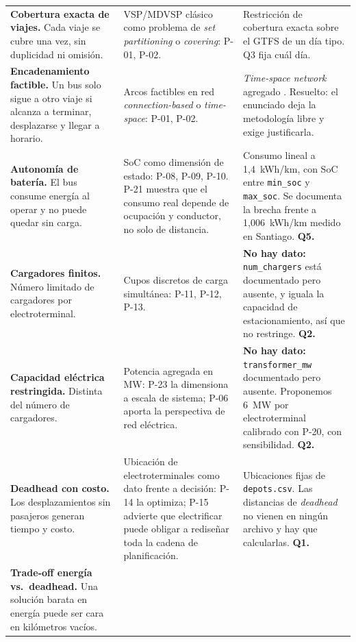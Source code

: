 \documentclass[11pt,a4paper,parskip=half]{scrartcl}
\begin{document}
\begin{landscape}
\begin{longtable}{@{}L{4.4cm}L{8.4cm}L{8.4cm}@{}}
\textbf{Cobertura exacta de viajes.} Cada viaje se cubre una vez, sin duplicidad ni omisión. &
VSP/MDVSP clásico como problema de \textit{set partitioning} o \textit{covering}: P-01, P-02. &
Restricción de cobertura exacta sobre el GTFS de un día tipo. \textcolor{slate}{Q3 fija cuál día.} \\
\addlinespace
{}
\textbf{Encadenamiento factible.} Un bus solo sigue a otro viaje si alcanza a terminar, desplazarse y llegar a horario. &
Arcos factibles en red \textit{connection-based} o \textit{time-space}: P-01, P-02. &
\textit{Time-space network} agregado \citep{kliewer_timespacemdvsp_2006}. \textcolor{slate}{Resuelto: el enunciado deja la metodología libre y exige justificarla.} \\
\addlinespace
\textbf{Autonomía de batería.} El bus consume energía al operar y no puede quedar sin carga. &
SoC como dimensión de estado: P-08, P-09, P-10. P-21 muestra que el consumo real depende de ocupación y conductor, no solo de distancia. &
Consumo lineal a 1{,}4~kWh/km, con SoC entre \texttt{min\_soc} y \texttt{max\_soc}. Se documenta la brecha frente a 1{,}006~kWh/km medido en Santiago. \textbf{Q5.} \\
\addlinespace
{}
\textbf{Cargadores finitos.} Número limitado de cargadores por electroterminal. &
Cupos discretos de carga simultánea: P-11, P-12, P-13. &
\textbf{No hay dato:} \texttt{num\_chargers} está documentado pero ausente, y  iguala la capacidad de estacionamiento, así que no restringe. \textbf{Q2.} \\
\addlinespace
\textbf{Capacidad eléctrica restringida.} Distinta del número de cargadores. &
Potencia agregada en MW: P-23 la dimensiona a escala de sistema; P-06 aporta la perspectiva de red eléctrica. &
\textbf{No hay dato:} \texttt{transformer\_mw} documentado pero ausente. Proponemos 6~MW por electroterminal calibrado con P-20, con sensibilidad. \textbf{Q2.} \\
\addlinespace
{}
\textbf{Deadhead con costo.} Los desplazamientos sin pasajeros generan tiempo y costo. &
Ubicación de electroterminales como dato frente a decisión: P-14 la optimiza; P-15 advierte que electrificar puede obligar a rediseñar toda la cadena de planificación. &
Ubicaciones fijas de \texttt{depots.csv}. Las distancias de \textit{deadhead} no vienen en ningún archivo y hay que calcularlas. \textbf{Q1.} \\
\addlinespace
\textbf{Trade-off energía vs.\ deadhead.} Una solución barata en energía puede ser cara en kilómetros vacíos. &

\end{longtable}
\end{landscape}
\end{document}
